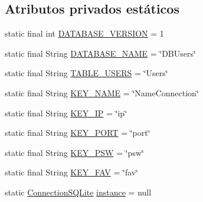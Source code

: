 \subsection*{Atributos privados estáticos}
\begin{DoxyCompactItemize}
\item 
static final int \hyperlink{classes_1_1ucm_1_1tfg_1_1controlremotolinux_1_1client_1_1model_1_1sql_1_1ConnectionSQLite_ad8fbc8c53385167fc3a3e0ba5abe220b}{D\-A\-T\-A\-B\-A\-S\-E\-\_\-\-V\-E\-R\-S\-I\-O\-N} = 1
\item 
static final String \hyperlink{classes_1_1ucm_1_1tfg_1_1controlremotolinux_1_1client_1_1model_1_1sql_1_1ConnectionSQLite_adaf5a6ead9220b7de37d129e2717ae6d}{D\-A\-T\-A\-B\-A\-S\-E\-\_\-\-N\-A\-M\-E} = \char`\"{}D\-B\-Users\char`\"{}
\item 
static final String \hyperlink{classes_1_1ucm_1_1tfg_1_1controlremotolinux_1_1client_1_1model_1_1sql_1_1ConnectionSQLite_a9b3967aef91ed2398b01da3f004b7ce5}{T\-A\-B\-L\-E\-\_\-\-U\-S\-E\-R\-S} = \char`\"{}Users\char`\"{}
\item 
static final String \hyperlink{classes_1_1ucm_1_1tfg_1_1controlremotolinux_1_1client_1_1model_1_1sql_1_1ConnectionSQLite_a50ffe039afb29158bc27b53f94395efc}{K\-E\-Y\-\_\-\-N\-A\-M\-E} = \char`\"{}Name\-Connection\char`\"{}
\item 
static final String \hyperlink{classes_1_1ucm_1_1tfg_1_1controlremotolinux_1_1client_1_1model_1_1sql_1_1ConnectionSQLite_a0efee646633ea8e4545b0e2a19ab04d9}{K\-E\-Y\-\_\-\-I\-P} = \char`\"{}ip\char`\"{}
\item 
static final String \hyperlink{classes_1_1ucm_1_1tfg_1_1controlremotolinux_1_1client_1_1model_1_1sql_1_1ConnectionSQLite_a9ff99d0cf0f9730b0cb37038b9dab67d}{K\-E\-Y\-\_\-\-P\-O\-R\-T} = \char`\"{}port\char`\"{}
\item 
static final String \hyperlink{classes_1_1ucm_1_1tfg_1_1controlremotolinux_1_1client_1_1model_1_1sql_1_1ConnectionSQLite_a9f0f2ae30756dfa124bb644736e6a667}{K\-E\-Y\-\_\-\-P\-S\-W} = \char`\"{}psw\char`\"{}
\item 
static final String \hyperlink{classes_1_1ucm_1_1tfg_1_1controlremotolinux_1_1client_1_1model_1_1sql_1_1ConnectionSQLite_a1110e1443cb78c4dbaaa4debe9006dcd}{K\-E\-Y\-\_\-\-F\-A\-V} = \char`\"{}fav\char`\"{}
\item 
static \hyperlink{classes_1_1ucm_1_1tfg_1_1controlremotolinux_1_1client_1_1model_1_1sql_1_1ConnectionSQLite}{Connection\-S\-Q\-Lite} \hyperlink{classes_1_1ucm_1_1tfg_1_1controlremotolinux_1_1client_1_1model_1_1sql_1_1ConnectionSQLite_ac17c5864a9bc052cf09c2a5aafebd398}{instance} = null
\end{DoxyCompactItemize}


